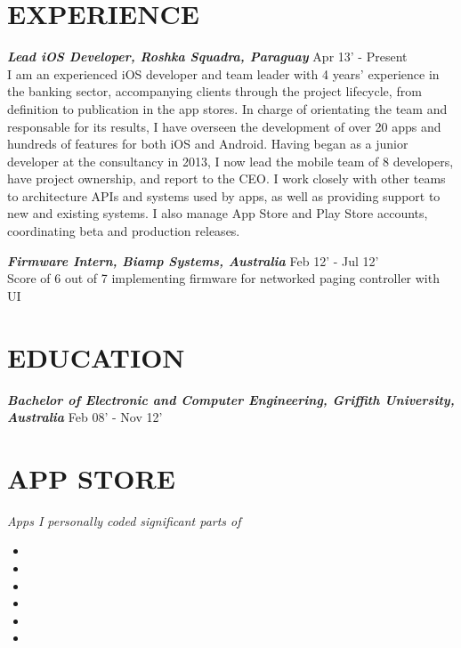 \documentclass[margin]{res}
\begin{document}
\begin{resume}
\section{EXPERIENCE}   
{\sl \textbf{Lead iOS Developer, Roshka Squadra, Paraguay}} \hfill Apr 13' - Present \\
		\break I am an experienced iOS developer and team leader with 4 years' experience in the banking sector, accompanying clients through the project lifecycle, from definition to publication in the app stores.\hfill \break
                In charge of orientating the team and responsable for its results, I have overseen the development of over 20 apps and hundreds of features for both iOS and Android. Having began as a junior developer at the consultancy in 2013, I now lead the mobile team of 8 developers, have project ownership, and report to the CEO.\hfill \break
              	I work closely with other teams to architecture APIs and systems used by apps, as well as providing support to new and existing systems. I also manage App Store and Play Store accounts, coordinating beta and production releases.\hfill 
      
 {\sl \textbf{Firmware Intern, Biamp Systems, Australia}} \hfill Feb 12' - Jul 12' \\
		\break Score of 6 out of 7 implementing firmware for networked paging controller with UI
		
\section{EDUCATION}   		
 {\sl \textbf{Bachelor of Electronic and Computer Engineering, Griffith University, Australia}} \hfill Feb 08' - Nov 12' \\
	
\section{APP STORE}   
	{\sl Apps I personally coded significant parts of}    
	\begin{itemize}  \itemsep -2pt %
            \renewcommand\labelitemi{\tiny$\blacksquare$}
	    \item{}
	    \item{}
	    \item{}
	    \item{}
	    \item{}
	    \item{}
	\end{itemize}
                   

\end{resume}
\end{document}
